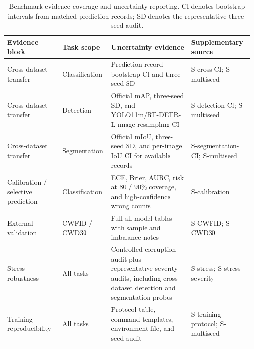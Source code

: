 \begin{table}[!htbp]
\centering
\footnotesize
\setlength{\tabcolsep}{3pt}
\renewcommand{\arraystretch}{1.17}
\caption{Benchmark evidence coverage and uncertainty reporting. CI denotes bootstrap intervals from matched prediction records; SD denotes the representative three-seed audit.}
\label{tab:evidence}
\begin{tabularx}{\textwidth}{@{}P{0.21\textwidth}P{0.15\textwidth}X P{0.21\textwidth}@{}}
\toprule
Evidence block & Task scope & Uncertainty evidence & Supplementary source \\
\midrule
Cross-dataset transfer & Classification & Prediction-record bootstrap CI and three-seed SD & S-cross-CI; S-multiseed \\
Cross-dataset transfer & Detection & Official mAP, three-seed SD, and YOLO11m/RT-DETR-L image-resampling CI & S-detection-CI; S-multiseed \\
Cross-dataset transfer & Segmentation & Official mIoU, three-seed SD, and per-image IoU CI for available records & S-segmentation-CI; S-multiseed \\
Calibration / selective prediction & Classification & ECE, Brier, AURC, risk at 80 / 90\% coverage, and high-confidence wrong counts & S-calibration \\
External validation & CWFID / CWD30 & Full all-model tables with sample and imbalance notes & S-CWFID; S-CWD30 \\
Stress robustness & All tasks & Controlled corruption audit plus representative severity audits, including cross-dataset detection and segmentation probes & S-stress; S-stress-severity \\
Training reproducibility & All tasks & Protocol table, command templates, environment file, and seed audit & S-training-protocol; S-multiseed \\
\bottomrule
\end{tabularx}
\end{table}
